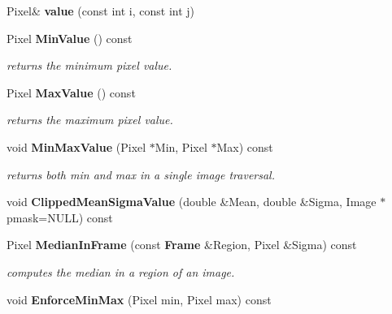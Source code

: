 \begin{CompactItemize}
\item 
{}
Pixel\& {\bf value} (const int i, const int j)\label{class_image_a6}

\item 
{}
Pixel {\bf Min\-Value} () const\label{class_image_a7}

\begin{CompactList}\small\item\em returns the minimum pixel value.\item\end{CompactList}\item 
{}
Pixel {\bf Max\-Value} () const\label{class_image_a8}

\begin{CompactList}\small\item\em returns the maximum pixel value.\item\end{CompactList}\item 
{}
void {\bf Min\-Max\-Value} (Pixel $\ast$Min, Pixel $\ast$Max) const\label{class_image_a9}

\begin{CompactList}\small\item\em returns both min and max in a single image traversal.\item\end{CompactList}\item 
{}
void {\bf Clipped\-Mean\-Sigma\-Value} (double \&Mean, double \&Sigma, Image $\ast$pmask=NULL) const\label{class_image_a10}

\item 
{}
Pixel {\bf Median\-In\-Frame} (const {\bf Frame} \&Region, Pixel \&Sigma) const\label{class_image_a11}

\begin{CompactList}\small\item\em computes the median in a region of an image.\item\end{CompactList}\item 
{}
void {\bf Enforce\-Min\-Max} (Pixel min, Pixel max) const\label{class_image_a12}


\end{CompactItemize}
